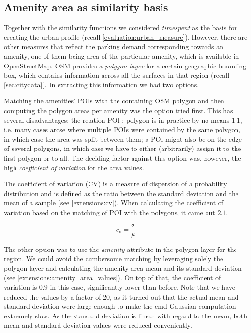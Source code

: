 	
\subsection{Amenity area as similarity basis}
\label{extensions:amenity_area}
Together with the similarity functions we considered \textit{timespent} as the basis for creating the urban profile (recall \ref{evaluation:urban_measure}). However, there are other measures that reflect the parking demand corresponding towards an amenity, one of them being area of the particular amenity, which is available in OpenStreetMap. OSM provides a \textit{polygon layer} for a certain geographic bounding box, which contains information across all the surfaces in that region (recall \ref{sec:citydata}). In extracting this information we had two options. 

Matching the amenities' POIs with the containing OSM polygon and then computing the polygon areas per amenity was the option tried first. This has several disadvantages: the relation POI : polygon is in practice by no means 1:1, i.e. many cases arose where multiple POIs were contained by the same polygon, in which case the area was split between them; a POI might also be on the edge of several polygons, in which case we have to either (arbitrarily) assign it to the first polygon or to all. The deciding factor against this option was, however, the high \textit{coefficient of variation} for the area values. 

The coefficient of variation (CV) is a measure of dispersion of a probability distribution and is defined as the ratio between the standard deviation and the mean of a sample (see \ref{extensions:cv}). When calculating the coefficient of variation based on the matching of POI with the polygons, it came out $2.1$.

\begin{equation}
c_v = \frac{\sigma}{\mu} 
\label{extensions:cv}
\end{equation}

The other option was to use the \textit{amenity} attribute in the polygon layer for the region. We could avoid the cumbersome matching by leveraging solely the polygon layer and calculating the amenity area mean and its standard deviation (see \ref{extensions:amenity_area_values}). On top of that, the coefficient of variation is $0.9$ in this case, significantly lower than before. Note that we have reduced the values by a factor of 20, as it turned out that the actual mean and standard deviation were large enough to make the emd Gaussian computation extremely slow. As the standard deviation is linear with regard to the mean, both mean and standard deviation values were reduced conveniently. 

